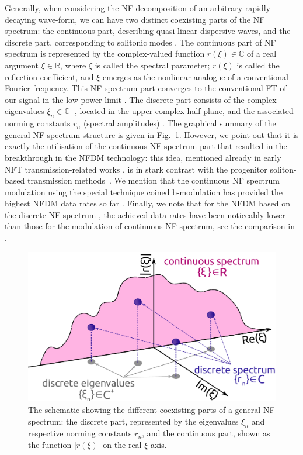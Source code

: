 Generally, when considering the NF decomposition of an arbitrary rapidly decaying wave-form, we can have two distinct coexisting parts of the NF spectrum: the continuous part, describing quasi-linear dispersive waves, and the discrete part, corresponding to solitonic modes \cite{nmp84,akn74,tplwfkd17,yk14-1}. The continuous part of NF spectrum is represented by the complex-valued function $r(\xi) \in \mathbb{C}$ of a real argument $\xi \in \mathbb{R}$, where $\xi$ is called the spectral parameter; $r(\xi)$ is called the reflection coefficient, and $\xi$ emerges as the nonlinear analogue of a conventional Fourier frequency. This NF spectrum part converges to the conventional FT of our signal in the low-power limit \cite{pdt13}. The discrete part consists of the complex eigenvalues $\xi_n \in \mathbb{C}^{+}$, located in the upper complex half-plane, and the associated norming constants $r_n$ (spectral amplitudes) \cite{a16}. The graphical summary of the general NF spectrum structure is given in Fig.~\ref{fig:spectrum_representation}. However, we point out that it is exactly the utilisation of the continuous NF spectrum part \cite{pdbgt14,lpt14,lpt15,lpr15,lpphet16,lab17,kplt17_2,yy19} that resulted in the breakthrough in the NFDM technology: this idea, mentioned already in early NFT transmission-related works \cite{yk14-1,pdt13}, is in stark contrast with the progenitor soliton-based transmission methods~\cite{mg06}. We mention that the continuous NF spectrum modulation using the special technique coined b-modulation \cite{w17,gzl18,svp20,cw20} has provided the highest NFDM data rates so far \cite{yal19,yla19}.  Finally, we note that for the NFDM based on the discrete NF spectrum \cite{hyk16,bai16,wxz20}, the achieved data rates have been noticeably lower than those for the modulation of continuous NF spectrum, see the comparison in \cite[Fig. 1]{yal19}.
\begin{figure}[tbh]
    \centering
    \includegraphics[width=0.55\linewidth]{images/nn_nft/nft_spectrum_representation_6.pdf}
    \caption{The schematic showing the different coexisting parts of a general NF spectrum: the discrete part, represented by the eigenvalues $\xi_n$ and respective norming constants $r_n$, and the continuous part, shown as the function $|r(\xi)|$ on the real $\xi$-axis. }
    \label{fig:spectrum_representation}
\end{figure}

